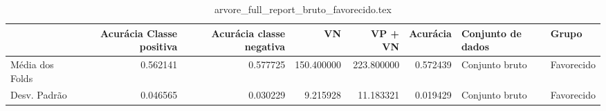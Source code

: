 \begin{table}
\centering
\caption{arvore_full_report_bruto_favorecido.tex}
\label{arvore_full_report_bruto_favorecido.tex}
\begin{tabular}{lrrrrrll}
\toprule
{}              &  Acurácia Classe positiva &  Acurácia classe negativa &         VN  &    VP + VN  &  Acurácia & Conjunto de dados &       Grupo \\
\midrule
Média dos Folds &                  0.562141 &                  0.577725 &  150.400000 &  223.800000 &  0.572439 &    Conjunto bruto &  Favorecido \\
Desv. Padrão    &                  0.046565 &                  0.030229 &    9.215928 &   11.183321 &  0.019429 &    Conjunto bruto &  Favorecido \\
\bottomrule
\end{tabular}
\end{table}
